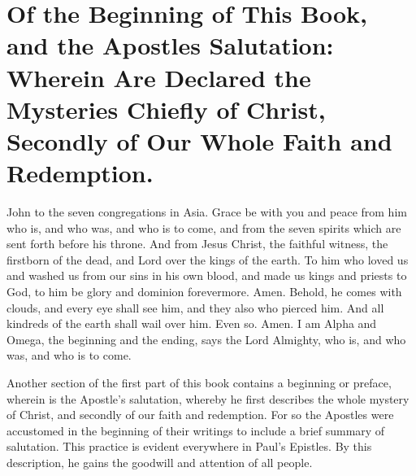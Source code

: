 \chapter[Sermon 3. Of the Beginning of This Book, and the Apostles Salutation: Wherein Are Declared the Mysteries Chiefly of Christ, Secondly of Our Whole Faith and Redemption.]{Of the Beginning of This Book, and the Apostles Salutation: Wherein Are Declared the Mysteries Chiefly of Christ, Secondly of Our Whole Faith and Redemption.}
\label{sermon:003}

John to the seven congregations in Asia. Grace be with you and peace from him who is, and who was, and who is to come, and from the seven spirits which are sent forth before his throne. And from Jesus Christ, the faithful witness, the firstborn of the dead, and Lord over the kings of the earth. To him who loved us and washed us from our sins in his own blood, and made us kings and priests to God, to him be glory and dominion forevermore. Amen. Behold, he comes with clouds, and every eye shall see him, and they also who pierced him. And all kindreds of the earth shall wail over him. Even so. Amen. I am Alpha and Omega, the beginning and the ending, says the Lord Almighty, who is, and who was, and who is to come.

Another section of the first part of this book contains a beginning or preface, wherein is the Apostle’s salutation, whereby he first describes the whole mystery of Christ, and secondly of our faith and redemption. For so the Apostles were accustomed in the beginning of their writings to include a brief summary of salutation. This practice is evident everywhere in Paul’s Epistles. By this description, he gains the goodwill and attention of all people.


